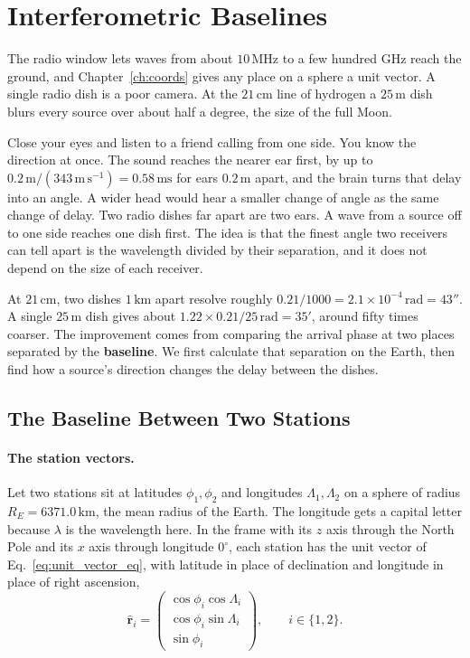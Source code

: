\section{Interferometric Baselines}
\label{sec:baselines}

The radio window lets waves from about $10\,\mathrm{MHz}$ to a few hundred GHz reach the ground, and Chapter~\ref{ch:coords} gives any place on a sphere a unit vector. A single radio dish is a poor camera. At the $21\,\mathrm{cm}$ line of hydrogen a $25\,\mathrm m$ dish blurs every source over about half a degree, the size of the full Moon.

Close your eyes and listen to a friend calling from one side. You know the direction at once. The sound reaches the nearer ear first, by up to $0.2\,\mathrm m/(343\,\mathrm{m\,s^{-1}})=0.58\,\mathrm{ms}$ for ears $0.2\,\mathrm m$ apart, and the brain turns that delay into an angle. A wider head would hear a smaller change of angle as the same change of delay. Two radio dishes far apart are two ears. A wave from a source off to one side reaches one dish first. The idea is that the finest angle two receivers can tell apart is the wavelength divided by their separation, and it does not depend on the size of each receiver.

At $21\,\mathrm{cm}$, two dishes $1\,\mathrm{km}$ apart resolve roughly $0.21/1000=2.1\times10^{-4}\,\mathrm{rad}=43''$. A single $25\,\mathrm m$ dish gives about $1.22\times0.21/25\,\mathrm{rad}=35'$, around fifty times coarser. The improvement comes from comparing the arrival phase at two places separated by the \textbf{baseline}. We first calculate that separation on the Earth, then find how a source's direction changes the delay between the dishes.

\subsection{The Baseline Between Two Stations}

\paragraph{The station vectors.} Let two stations sit at latitudes $\phi_1,\phi_2$ and longitudes $\Lambda_1,\Lambda_2$ on a sphere of radius $R_E=6371.0\,\mathrm{km}$, the mean radius of the Earth. The longitude gets a capital letter because $\lambda$ is the wavelength here. In the frame with its $z$ axis through the North Pole and its $x$ axis through longitude $0^\circ$, each station has the unit vector of Eq.~\eqref{eq:unit_vector_eq}, with latitude in place of declination and longitude in place of right ascension,
\begin{equation}
	\hat{\mathbf r}_i = \begin{pmatrix} \cos\phi_i\cos\Lambda_i \\ \cos\phi_i\sin\Lambda_i \\ \sin\phi_i \end{pmatrix}, \qquad i \in \{1, 2\}.
	\label{eq:earth_station_vector}
\end{equation}

